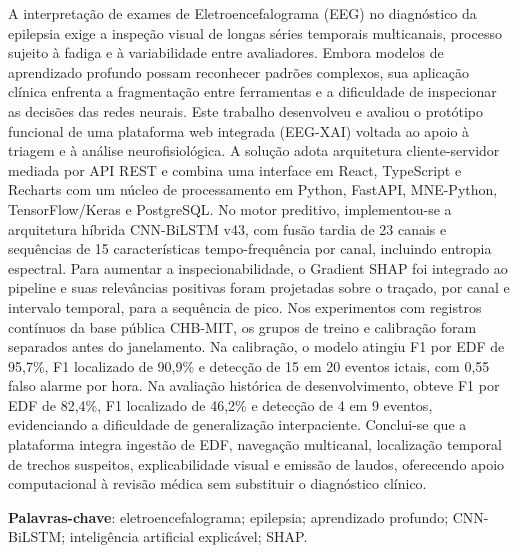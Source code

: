 \begin{resumo}
A interpretação de exames de Eletroencefalograma (EEG) no diagnóstico da epilepsia exige a inspeção visual de longas séries temporais multicanais, processo sujeito à fadiga e à variabilidade entre avaliadores. Embora modelos de aprendizado profundo possam reconhecer padrões complexos, sua aplicação clínica enfrenta a fragmentação entre ferramentas e a dificuldade de inspecionar as decisões das redes neurais. Este trabalho desenvolveu e avaliou o protótipo funcional de uma plataforma web integrada (EEG-XAI) voltada ao apoio à triagem e à análise neurofisiológica. A solução adota arquitetura cliente-servidor mediada por API REST e combina uma interface em React, TypeScript e Recharts com um núcleo de processamento em Python, FastAPI, MNE-Python, TensorFlow/Keras e PostgreSQL. No motor preditivo, implementou-se a arquitetura híbrida CNN-BiLSTM v43, com fusão tardia de 23 canais e sequências de 15 características tempo-frequência por canal, incluindo entropia espectral. Para aumentar a inspecionabilidade, o Gradient SHAP foi integrado ao pipeline e suas relevâncias positivas foram projetadas sobre o traçado, por canal e intervalo temporal, para a sequência de pico. Nos experimentos com registros contínuos da base pública CHB-MIT, os grupos de treino e calibração foram separados antes do janelamento. Na calibração, o modelo atingiu F1 por EDF de 95,7\%, F1 localizado de 90,9\% e detecção de 15 em 20 eventos ictais, com 0,55 falso alarme por hora. Na avaliação histórica de desenvolvimento, obteve F1 por EDF de 82,4\%, F1 localizado de 46,2\% e detecção de 4 em 9 eventos, evidenciando a dificuldade de generalização interpaciente. Conclui-se que a plataforma integra ingestão de EDF, navegação multicanal, localização temporal de trechos suspeitos, explicabilidade visual e emissão de laudos, oferecendo apoio computacional à revisão médica sem substituir o diagnóstico clínico.

\vspace{\onelineskip}
\noindent\textbf{Palavras-chave}: eletroencefalograma; epilepsia; aprendizado profundo; CNN-BiLSTM; inteligência artificial explicável; SHAP.
\end{resumo}

